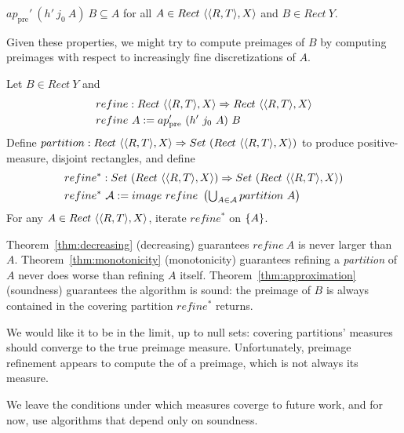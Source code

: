 \documentclass{llncs}
\newcommand{\pre}{_\mathrm{pre}}
\begin{document}
\begin{theorem}[decreasing]
\label{thm:decreasing}
$ap\pre'~(h'~j_0~A)~B \subseteq A$ for all $A \in Rect~\langle{\langle{R,T}\rangle,X}\rangle$ and $B \in Rect~Y$.
\end{theorem}

Given these properties, we  might try to compute preimages of $B$ by computing preimages with respect to increasingly fine discretizations of $A$.

\begin{definition}
\label{def:preimage-refinement}
Let $B \in Rect~Y$ and
\begin{equation}
\begin{aligned}
	&refine : Rect~\pair{\pair{R,T},X} \tto Rect~\pair{\pair{R,T},X} \\
	&refine~A := ap\pre'~(h'~j_0~A)~B
\end{aligned}
\end{equation}
Define $partition : Rect~\langle{\langle{R,T}\rangle,X}\rangle \Rightarrow Set~(Rect~\langle{\langle{R,T}\rangle,X}\rangle)$ to produce positive-measure, disjoint rectangles, and define
\begin{equation}
\begin{aligned}
	&refine^* : Set~(Rect~\langle{\langle{R,T}\rangle,X}\rangle) \Rightarrow Set~(Rect~\langle{\langle{R,T}\rangle,X}\rangle) \\
	&refine^*~\mathcal{A} := image~refine~\left(\textstyle\bigcup_{A \in \mathcal{A}} partition~A \right)
\end{aligned}
\end{equation}
For any $A \in Rect~\langle{\langle{R,T}\rangle,X}\rangle$, iterate $refine^*$ on $\{{A}\}$.
\end{definition}

Theorem~\ref{thm:decreasing} (decreasing) guarantees $refine~A$ is never larger than $A$.
Theorem~\ref{thm:monotonicity} (monotonicity) guarantees refining a \emph{partition} of $A$ never does worse than refining $A$ itself.
Theorem~\ref{thm:approximation} (soundness) guarantees the algorithm is sound: the preimage of $B$ is always contained in the covering partition $refine^*$ returns.

We would like it to be  in the limit, up to null sets: covering partitions' measures should converge to the true preimage measure.
Unfortunately, preimage refinement appears to compute the  of a preimage, which is not always its measure.

We leave the conditions under which measures coverge to future work, and for now, use algorithms that depend only on soundness.
\end{document}
